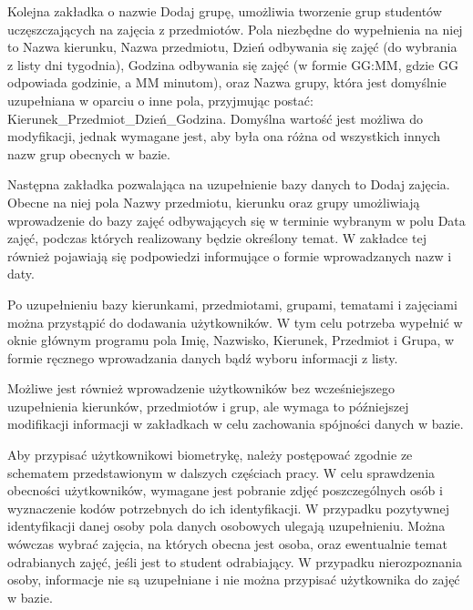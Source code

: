 \begin{figure}
\label{fig:dodajTemat}
\end{figure}

\begin{figure}
\label{fig:dodajZajecia}
\end{figure}
Kolejna zakładka o nazwie Dodaj grupę, umożliwia tworzenie grup studentów uczęszczających na zajęcia z przedmiotów. Pola niezbędne do wypełnienia na niej to Nazwa kierunku, Nazwa przedmiotu, Dzień odbywania się zajęć (do wybrania z listy dni tygodnia), Godzina odbywania się zajęć (w formie GG:MM, gdzie GG odpowiada godzinie, a MM minutom), oraz Nazwa grupy, która jest domyślnie uzupełniana w oparciu o inne pola, przyjmując postać: Kierunek\_Przedmiot\_Dzień\_Godzina. Domyślna wartość jest możliwa do modyfikacji, jednak wymagane jest, aby była ona różna od wszystkich innych nazw grup obecnych w bazie.

Następna zakładka pozwalająca na uzupełnienie bazy danych to Dodaj zajęcia. Obecne na niej pola Nazwy przedmiotu, kierunku oraz grupy umożliwiają wprowadzenie do bazy zajęć odbywających się w terminie wybranym w polu Data zajęć, podczas których realizowany będzie określony temat. W zakładce tej również pojawiają się podpowiedzi informujące o formie wprowadzanych nazw i daty.

\begin{figure}
\label{fig:oknoGlowne}
\end{figure}

\begin{figure}
\label{fig:wybraneTabele}
\end{figure}

Po uzupełnieniu bazy kierunkami, przedmiotami, grupami, tematami i zajęciami można przystąpić do dodawania użytkowników. W tym celu potrzeba wypełnić w oknie głównym programu pola Imię, Nazwisko, Kierunek, Przedmiot i Grupa, w formie ręcznego wprowadzania danych bądź wyboru informacji z listy.

Możliwe jest również wprowadzenie użytkowników bez wcześniejszego uzupełnienia kierunków, przedmiotów i grup, ale wymaga to późniejszej modifikacji informacji w zakładkach w celu zachowania spójności danych w bazie.

Aby przypisać użytkownikowi biometrykę, należy postępować zgodnie ze schematem przedstawionym w dalszych częściach pracy.
W celu sprawdzenia obecności użytkowników, wymagane jest pobranie zdjęć poszczególnych osób i wyznaczenie kodów potrzebnych do ich identyfikacji. W przypadku pozytywnej identyfikacji danej osoby pola danych osobowych ulegają uzupełnieniu. Można wówczas wybrać zajęcia, na których obecna jest osoba, oraz ewentualnie temat odrabianych zajęć, jeśli jest to student odrabiający. W przypadku nierozpoznania osoby, informacje nie są uzupełniane i nie można przypisać użytkownika do zajęć w bazie.

